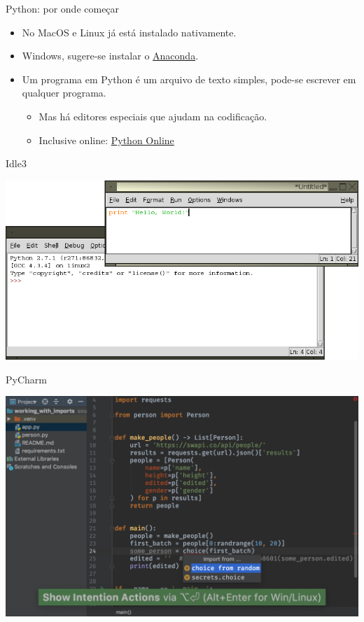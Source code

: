 \documentclass{beamer}
\begin{document}
\begin{frame}{Python: por onde começar}
 
 \begin{itemize}
  \vfill \item No MacOS e Linux já está instalado nativamente.
  \vfill \item Windows, sugere-se instalar o \href{https://www.anaconda.com/distribution/}{Anaconda}.
  \vfill \item Um programa em Python é um arquivo de texto simples, pode-se escrever em qualquer programa.
  
  \begin{itemize}
   \vfill\item Mas há editores especiais que ajudam na codificação.
   \vfill\item Inclusive online: \href{https://pynative.com/online-python-code-editor-to-execute-python-code/}{Python Online}
  \end{itemize}  
 \end{itemize}
\end{frame}


\begin{frame}{Idle3}
 \begin{center}
  \includegraphics[scale=0.8]{./figures/idle3.png}
 \end{center}
\end{frame}

\begin{frame}{PyCharm}
 \begin{center}
  \includegraphics[scale=0.4]{./figures/pycharm.png}
 \end{center}
\end{frame}
\end{document}
